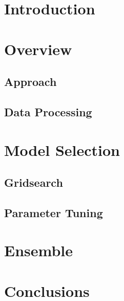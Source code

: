 \newif\ifshowsolutions
\showsolutionstrue

\newcommand{\boldline}[1]{\underline{\textbf{#1}}}



\pagestyle{fancy}

\section{Introduction}

\bigskip

\section {Overview}

\bigskip

\subsection{Approach}

\medskip

\subsection {Data Processing}

\bigskip

\section{Model Selection}

\medskip

\subsection{Gridsearch}

\medskip

\subsection{Parameter Tuning}

\bigskip

\section{Ensemble}

\medskip

\bigskip

\section{Conclusions}

